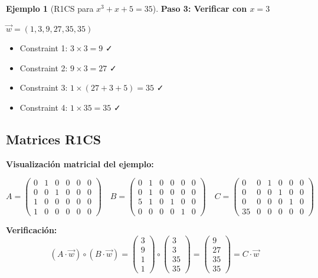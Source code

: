 \documentclass[11pt,a4paper,twoside,openright]{book}
\theoremstyle{definition}
\newtheorem{example}{Ejemplo}[chapter]
\theoremstyle{plain}
\theoremstyle{remark}
\begin{document}
\begin{example}[R1CS para $x^3 + x + 5 = 35$]
\textbf{Paso 3: Verificar con $x = 3$}

$\vec{w} = (1, 3, 9, 27, 35, 35)$

\begin{itemize}
    \item Constraint 1: $3 \times 3 = 9$ ✓
    \item Constraint 2: $9 \times 3 = 27$ ✓
    \item Constraint 3: $1 \times (27 + 3 + 5) = 35$ ✓
    \item Constraint 4: $1 \times 35 = 35$ ✓
\end{itemize}
\end{example}

\subsection{Matrices R1CS}

\begin{mathnote}
\textbf{Visualización matricial del ejemplo:}

\[
A = \begin{pmatrix}
0 & 1 & 0 & 0 & 0 & 0 \\
0 & 0 & 1 & 0 & 0 & 0 \\
1 & 0 & 0 & 0 & 0 & 0 \\
1 & 0 & 0 & 0 & 0 & 0
\end{pmatrix}
\quad
B = \begin{pmatrix}
0 & 1 & 0 & 0 & 0 & 0 \\
0 & 1 & 0 & 0 & 0 & 0 \\
5 & 1 & 0 & 1 & 0 & 0 \\
0 & 0 & 0 & 0 & 1 & 0
\end{pmatrix}
\quad
C = \begin{pmatrix}
0 & 0 & 1 & 0 & 0 & 0 \\
0 & 0 & 0 & 1 & 0 & 0 \\
0 & 0 & 0 & 0 & 1 & 0 \\
35 & 0 & 0 & 0 & 0 & 0
\end{pmatrix}
\]

\textbf{Verificación:}
\[
(A \cdot \vec{w}) \circ (B \cdot \vec{w}) = \begin{pmatrix} 3 \\ 9 \\ 1 \\ 1 \end{pmatrix} \circ \begin{pmatrix} 3 \\ 3 \\ 35 \\ 35 \end{pmatrix} = \begin{pmatrix} 9 \\ 27 \\ 35 \\ 35 \end{pmatrix} = C \cdot \vec{w}
\]
\end{mathnote}
\end{document}
